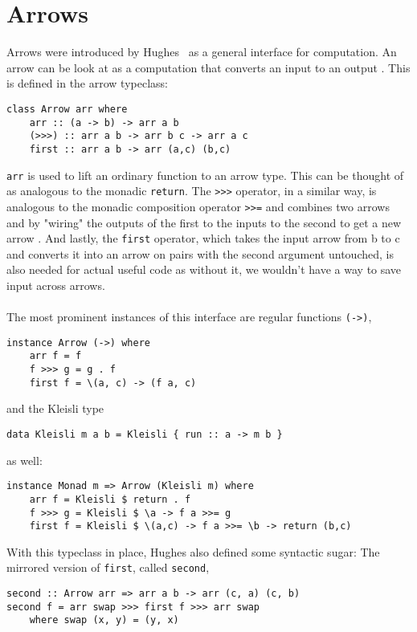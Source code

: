 \section{Arrows}
Arrows were introduced by Hughes \citHughes ~as a general interface for computation. An arrow  can be look at as a computation that converts an input  to an output . This is defined in the arrow typeclass:
\begin{lstlisting}[frame=htrbl]
class Arrow arr where
	arr :: (a -> b) -> arr a b
	(>>>) :: arr a b -> arr b c -> arr a c
	first :: arr a b -> arr (a,c) (b,c)
\end{lstlisting}
\lstinline{arr} is used to lift an ordinary function to an arrow type. This can be thought of as analogous to the monadic \lstinline{return}. The \lstinline{>>>} operator, in a similar way, is analogous to the monadic composition operator \lstinline{>>=} and combines two arrows  and  by "wiring" the outputs of the first to the inputs to the second to get a new arrow . And lastly, the \lstinline{first} operator, which takes the input arrow from b to c and converts it into an arrow on pairs with the second argument untouched, is also needed for actual useful code as without it, we wouldn't have a way to save input across arrows.
\\\\
The most prominent instances of this interface are regular functions \lstinline{(->)},
\begin{lstlisting}[frame=htrbl]
instance Arrow (->) where
	arr f = f
	f >>> g = g . f
	first f = \(a, c) -> (f a, c) 
\end{lstlisting}
and the Kleisli type
\begin{lstlisting}[frame=htrbl]
data Kleisli m a b = Kleisli { run :: a -> m b }
\end{lstlisting}
as well:
\begin{lstlisting}[frame=htrbl]
instance Monad m => Arrow (Kleisli m) where
	arr f = Kleisli $ return . f
	f >>> g = Kleisli $ \a -> f a >>= g
	first f = Kleisli $ \(a,c) -> f a >>= \b -> return (b,c)
\end{lstlisting}
With this typeclass in place, Hughes also defined some syntactic sugar: The mirrored version of \lstinline{first}, called \lstinline{second},
\begin{lstlisting}[frame=htrbl]
second :: Arrow arr => arr a b -> arr (c, a) (c, b)
second f = arr swap >>> first f >>> arr swap
	where swap (x, y) = (y, x)
\end{lstlisting}
